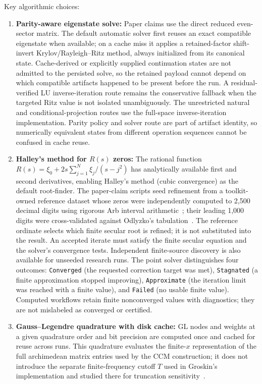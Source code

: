 \documentclass[11pt,a4paper]{article}
\begin{document}
Key algorithmic choices:
\begin{enumerate}
\item \textbf{Parity-aware eigenstate solve:} Paper claims use the
direct reduced even-sector matrix. The default automatic solver first
reuses an exact compatible eigenstate when available; on a cache miss
it applies a retained-factor shift-invert Krylov/Rayleigh--Ritz method,
always initialized from its canonical state. Cache-derived or explicitly
supplied continuation states are not admitted to the persisted solve, so
the retained payload cannot depend on which compatible artifacts happened
to be present before the run. A
residual-verified LU inverse-iteration route remains the conservative
fallback when the targeted Ritz value is not isolated unambiguously.
The unrestricted natural and conditional-projection routes use the
full-space inverse-iteration implementation. Parity policy and solver
route are part of artifact identity, so numerically equivalent states
from different operation sequences cannot be confused in cache reuse.
\item \textbf{Halley's method for $R(s)$ zeros:} The rational
function $R(s)=\xi_0+2s\sum_{j=1}^{N}\xi_j/(s-j^2)$ has analytically
available first and second derivatives, enabling Halley's method
(cubic convergence) as the default root-finder. The paper-claim
scripts seed refinement from a toolkit-owned reference dataset whose
zeros were independently computed to 2,500 decimal digits using
rigorous Arb interval arithmetic~\cite{JohanssonArb}; their leading
1,000 digits were cross-validated against Odlyzko's
tabulation~\cite{Odlyzko}. The
reference ordinate selects which finite secular root is refined; it is
not substituted into the result. An accepted iterate must satisfy the
finite secular equation and the solver's convergence tests.
Independent finite-source discovery is also available for unseeded
research runs. The point solver distinguishes four outcomes:
\texttt{Converged} (the requested correction target was met),
\texttt{Stagnated} (a finite approximation stopped improving),
\texttt{Approximate} (the iteration limit was reached with a finite
value), and \texttt{Failed} (no usable finite value). Computed
workflows retain finite nonconverged values with diagnostics; they are
not mislabeled as converged or certified.
\item \textbf{Gauss--Legendre quadrature with disk cache:}
GL nodes and weights at a given quadrature order and bit precision
are computed once and cached for reuse across runs. This quadrature
evaluates the finite-$x$ representation of the full archimedean matrix
entries used by the CCM construction; it does not introduce the separate
finite-frequency cutoff $T$ used in Groskin's implementation and studied
there for truncation sensitivity~\cite{Groskin2026HighPrecision}.
\end{enumerate}
\end{document}
